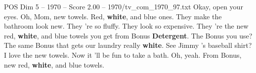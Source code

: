 \begin{textsample}{POS Dim 5 – 1970 – Score 2.00 – 1970/tv\_com\_1970\_97.txt}  \label{ex:f5_pos_051}
Okay, open your eyes.
Oh, Mom, new towels.
Red, \textbf{white}, and blue ones.
They make the bathroom look new.
They 're so fluffy.
They look so expensive.
They 're the new red, \textbf{white}, and blue towels you get from Bonus \textbf{Detergent}.
The Bonus you use?
The same Bonus that gets our laundry really \textbf{white}.
See Jimmy 's baseball shirt?
I love the new towels.
Now it 'll be fun to take a bath.
Oh, yeah.
From Bonus, new red, \textbf{white}, and blue towels.

\end{textsample}
